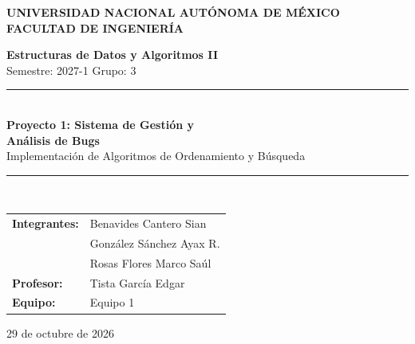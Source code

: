 \documentclass[12pt,letterpaper]{article}
\begin{document}
\begin{titlepage}
    \centering
    
    {\Large \textbf{UNIVERSIDAD NACIONAL AUTÓNOMA DE MÉXICO}}\\[0.3cm]
    {\large \textbf{FACULTAD DE INGENIERÍA}}\\[0.2cm]
    \vspace{2cm}
    
    {\large \textbf{Estructuras de Datos y Algoritmos II}}\\[0.2cm]
    {\small Semestre: 2027-1 \quad Grupo: 3}\\[0.6cm]
    
    \rule{0.9\textwidth}{0.6pt}\\[0.4cm]
    {\LARGE \textbf{Proyecto 1: Sistema de Gestión y}}\\[0.2cm]
    {\LARGE \textbf{Análisis de Bugs}}\\[0.3cm]
    {\normalsize Implementación de Algoritmos de Ordenamiento y Búsqueda}\\[0.2cm]
    \rule{0.9\textwidth}{0.6pt}\\[2cm]
    
    \begin{center}
    \begin{tabular}{ll}
        \textbf{Integrantes:} & Benavides Cantero Sian \\
                             & González Sánchez Ayax R. \\
                             & Rosas Flores Marco Saúl \\[0.5cm]
        \textbf{Profesor:}   & Tista García Edgar \\[0.3cm]
        \textbf{Equipo:}     & Equipo 1 \\
    \end{tabular}
    \end{center}
    
    \vfill
    
    {\small 29 de octubre de 2026}

\end{titlepage}

\newpage

\tableofcontents
\newpage
\end{document}
